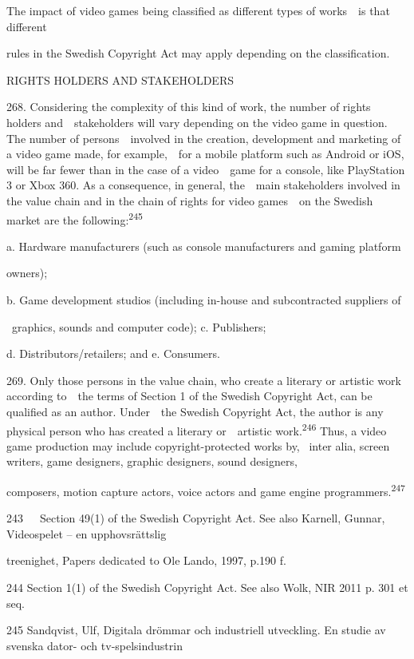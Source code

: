 \documentclass[
]{article}
\begin{document}
{The impact of video games being classified as different types of
works~~is that different}

{rules in the Swedish }{Copyright Act }{may apply depending on the
classification.}

{RIGHTS HOLDERS AND STAKEHOLDERS}

{268. }{Considering the complexity of this kind of work, the number of
rights holders and~~stakeholders will vary depending on the video game
in question. The number of persons~~involved in the creation,
development and marketing of a video game made, for example,~~for a
mobile platform such as Android or iOS, will be far fewer than in the
case of a video~~game for a console, like PlayStation 3 or Xbox 360. As
a consequence, in general, the~~main stakeholders involved in the value
chain and in the chain of rights for video games~~on the Swedish market
are the following:}\textsuperscript{{245}}

{a. Hardware manufacturers (such as console manufacturers and gaming
platform}

{owners);}

{b. Game development studios (including in-house and subcontracted
suppliers of}

{~graphics, sounds and computer code); c. Publishers;}

{d. Distributors/retailers; and e. Consumers.}

{269. }{Only those persons in the value chain, who create a literary or
artistic work according to~~the terms of Section 1 of the Swedish
}{Copyright Act}{, can be qualified as an }{author}{. Under~~the
}{Swedish Copyright Act}{, the author is any physical person who has
created a literary or~~artistic work.}\textsuperscript{{246 }}{Thus, a
video game production may include copyright-protected works by, }{~inter
alia}{, screen writers, game designers, graphic designers, sound
designers,}

{composers, motion capture actors, voice actors and game engine
programmers.}\textsuperscript{{247}}

{243}{~~~}{Section 49(1) of the Swedish }{Copyright Act}{. See also
Karnell, Gunnar, Videospelet }{-- }{en upphovsrättslig}

{treenighet, Papers dedicated to Ole Lando, 1997, p.190 f.}

{244 }{Section 1(1) of the Swedish }{Copyright Act}{. See also Wolk, NIR
2011 p. 301 }{et seq.}

{245 }{Sandqvist, Ulf, Digitala drömmar och industriell utveckling. En
studie av svenska dator- och tv-spelsindustrin}
\end{document}
